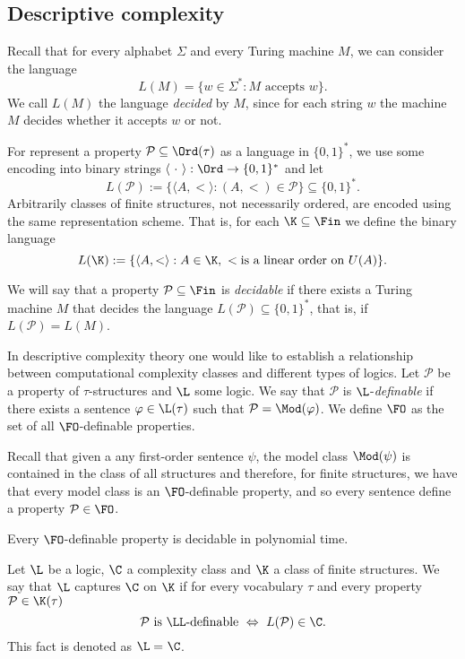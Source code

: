 \subsection{Descriptive complexity}
Recall that for every alphabet $\Sigma$ and every Turing machine $M$, we can consider the language \[L(M) = \{w\in\Sigma^{\ast} : M\text{ accepts }w\}.\] We call $L(M)$ the language \emph{decided} by $M$, since for each string $w$ the machine $M$ decides whether it accepts $w$ or not. 

For represent a property $\mathcal{P}\subseteq\Ord(\tau)$ as a language in $\{0,1\}^{\ast}$, we use some encoding into binary strings $\langle\ \cdot\ \rangle:\Ord\rightarrow\{0,1\}^{\ast}$ and let 
\[L(\mathcal{P}):=\{ \langle A, < \rangle: (A,<)\in\mathcal{P} \}\subseteq\{0,1\}^{\ast}.\]
Arbitrarily classes of finite structures, not necessarily ordered, are encoded using the same representation scheme. That is, for each $\K\subseteq \Fin$ we define the binary language 
\[L(\K):=\{ \langle A, < \rangle: A\in\K,\ <\text{is a linear order on } U(A) \}.\]

We will say that a property $\mathcal{P}\subseteq\Fin$ is \emph{decidable} if there exists  a Turing machine $M$ that decides the language $L(\mathcal{P})\subseteq \{0,1\}^{\ast}$, that is, if $L(\mathcal{P})=L(M)$.

In descriptive complexity theory one would like to establish a relationship between computational complexity classes and different types of logics.  Let $\mathcal{P}$ be a property of $\tau$-structures and $\L$ some logic. We say that $\mathcal{P}$ is $\L$-\emph{definable} if there exists a sentence $\varphi\in\L(\tau)$ such that $\mathcal{P} = \Mod(\varphi)$. We define $\FO$ as the set of all $\FO$-definable properties.

Recall that given a any first-order sentence $\psi$, the model class $\Mod(\psi)$ is contained in the class of all structures and therefore, for finite structures, we have that every model class is an $\FO$-definable property, and so every sentence define a property $\mathcal{P}\in\FO$. 

\begin{lem}\label{lem:4}
Every $\FO$-definable property is decidable in polynomial time.
\end{lem}

Let $\L$ be a logic, $\C$ a complexity class and $\K$ a class of finite structures. We say that $\L$ captures $\C$ on $\K$ if for every vocabulary $\tau$ and every property $\mathcal{P}\in\K(\tau)$
\[\mathcal{P}\text{ is $\LL$-definable }\Leftrightarrow\ L(\mathcal{P})\in\C.\] This fact is denoted as $\L =_{} \C$. 

